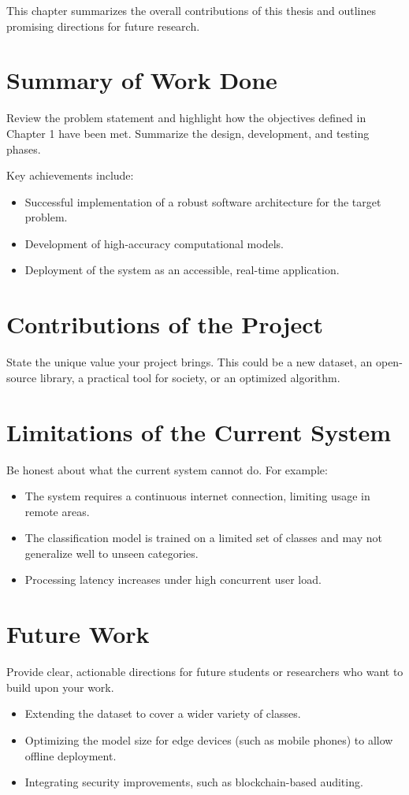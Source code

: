 This chapter summarizes the overall contributions of this thesis and outlines promising directions for future research.

\section{Summary of Work Done}
Review the problem statement and highlight how the objectives defined in Chapter 1 have been met. Summarize the design, development, and testing phases. 

Key achievements include:
\begin{itemize}
    \item Successful implementation of a robust software architecture for the target problem.
    \item Development of high-accuracy computational models.
    \item Deployment of the system as an accessible, real-time application.
\end{itemize}

\section{Contributions of the Project}
State the unique value your project brings. This could be a new dataset, an open-source library, a practical tool for society, or an optimized algorithm.

\section{Limitations of the Current System}
Be honest about what the current system cannot do. For example:
\begin{itemize}
    \item The system requires a continuous internet connection, limiting usage in remote areas.
    \item The classification model is trained on a limited set of classes and may not generalize well to unseen categories.
    \item Processing latency increases under high concurrent user load.
\end{itemize}

\section{Future Work}
Provide clear, actionable directions for future students or researchers who want to build upon your work.
\begin{itemize}
    \item Extending the dataset to cover a wider variety of classes.
    \item Optimizing the model size for edge devices (such as mobile phones) to allow offline deployment.
    \item Integrating security improvements, such as blockchain-based auditing.
\end{itemize}
